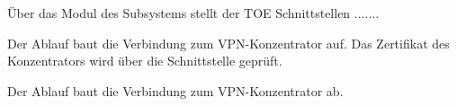 





Über das Modul  des Subsystems
 stellt der TOE
Schnittstellen .......




Der Ablauf baut die Verbindung zum VPN-Konzentrator auf. Das Zertifikat des
Konzentrators wird über die Schnittstelle 
geprüft.



Der Ablauf baut die Verbindung zum VPN-Konzentrator ab.





